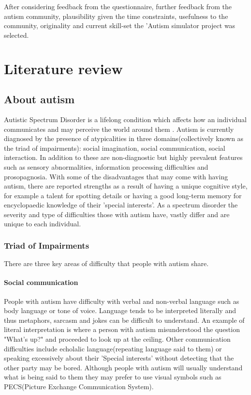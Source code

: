 \documentclass[11pt]{report}
\begin{document}
After considering feedback from the questionnaire, further feedback from the autism community, plausibility given the time constraints, usefulness to the community, originality and current skill-set the 'Autism simulator project was selected.

\chapter{Literature review}

\section{About autism}

Autistic Spectrum Disorder is a lifelong condition which affects how an individual communicates and may perceive the world around them \cite{nas}. Autism is currently diagnosed by the presence of atypicalities in three domains(collectively known as the triad of impairments): social imagination, social communication, social interaction. In addition to these are non-diagnostic but highly prevalent features such as sensory abnormalities, information processing difficulties and prosopagnosia. With some of the disadvantages that may come with having autism, there are reported strengths as a result of having a unique cognitive style, for example a talent for spotting details\cite{bayes} or having a good long-term memory for encyclopaedic knowledge of their 'special interests'. As a spectrum disorder the severity and type of difficulties those with autism have, vastly differ and are unique to each individual.


\subsection{Triad of Impairments}

There are three key areas of difficulty that people with autism share.

\subsubsection*{Social communication}
People with autism have difficulty with verbal and non-verbal language such as body language or tone of voice. Language tends to be interpreted literally and thus metaphors, sarcasm and jokes can be difficult to understand\cite{nas}. An example of literal interpretation is where a person with autism misunderstood the question "What's up?" and proceeded to look up at the ceiling. Other communication difficulties include echolalic language(repeating language said to them) or speaking excessively about their 'Special interests' without detecting that the other party may be bored\cite{nas}. Although people with autism will usually understand what is being said to them they may prefer to use visual symbols such as PECS(Picture Exchange Communication System). 
\end{document}
